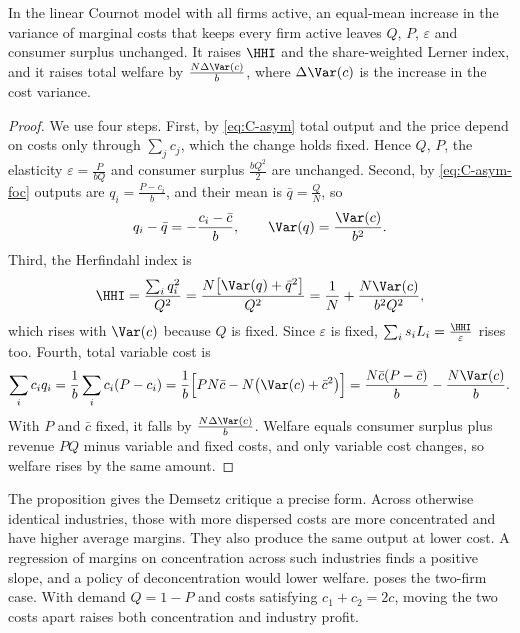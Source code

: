 \begin{proposition}\label{prop:C-demsetz}
In the linear Cournot model with all firms active, an equal-mean increase in the variance of marginal costs that keeps
every firm active leaves $Q$, $P$, $\varepsilon$ and consumer surplus unchanged. It raises $\HHI$ and the
share-weighted Lerner index, and it raises total welfare by $\frac{N\Delta\Var(c)}{b}$, where $\Delta\Var(c)$
is the increase in the cost variance.
\end{proposition}

\begin{proof}
We use four steps. First, by \eqref{eq:C-asym} total output and the price depend on costs only through
$\sum_j c_j$, which the change holds fixed. Hence $Q$, $P$, the elasticity $\varepsilon = \frac{P}{bQ}$ and
consumer surplus $\frac{bQ^2}{2}$ are unchanged. Second, by \eqref{eq:C-asym-foc} outputs are
$q_i = \frac{P - c_i}{b}$, and their mean is $\bar q = \frac{Q}{N}$, so
\begin{equation*}
q_i - \bar q = -\frac{c_i - \bar c}{b}, \qquad \Var(q) = \frac{\Var(c)}{b^2}.
\end{equation*}
Third, the Herfindahl index is
\begin{equation*}
\HHI = \frac{\sum_i q_i^2}{Q^2} = \frac{N\big[\Var(q) + \bar q^2\big]}{Q^2}
= \frac{1}{N} + \frac{N\Var(c)}{b^2Q^2},
\end{equation*}
which rises with $\Var(c)$ because $Q$ is fixed. Since $\varepsilon$ is fixed, $\sum_i s_iL_i =
\frac{\HHI}{\varepsilon}$ rises too. Fourth, total variable cost is
\begin{equation*}
\sum_i c_iq_i = \frac{1}{b}\sum_i c_i(P - c_i) = \frac{1}{b}\Big[PN\bar c - N\big(\Var(c) + \bar c^2\big)\Big]
= \frac{N\bar c(P - \bar c)}{b} - \frac{N\Var(c)}{b} .
\end{equation*}
With $P$ and $\bar c$ fixed, it falls by $\frac{N\Delta\Var(c)}{b}$. Welfare equals consumer surplus plus revenue
$PQ$ minus variable and fixed costs, and only variable cost changes, so welfare rises by the same amount.
\end{proof}

The proposition gives the Demsetz critique a precise form. Across otherwise identical industries, those with
more dispersed costs are more concentrated and have higher average margins. They also produce the same output
at lower cost. A regression of margins on concentration across such industries finds a positive slope, and
a policy of deconcentration would lower welfare. \citet[Section~5.5, Exercise~5.7]{Tirole1988} poses the two-firm
case. With demand $Q = 1 - P$ and costs satisfying $c_1 + c_2 = 2c$, moving the two costs apart raises both
concentration and industry profit.

